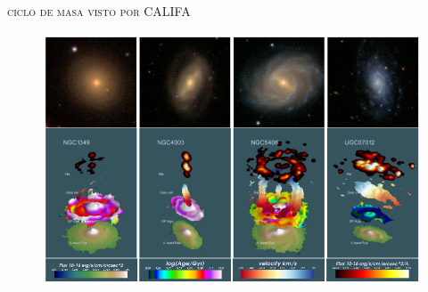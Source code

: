 \documentclass[xcolor=dvipsnames,4pt,hyperref={colorlinks,citecolor=black,linkcolor=black,urlcolor=black}]{beamer}
\begin{document}
\begin{frame}{\textsc{ciclo de masa visto por CALIFA}}
%
\begin{figure}
\includegraphics[scale=1]{img/husemann2013-20}
\end{figure}
%
\end{frame}
\end{document}
